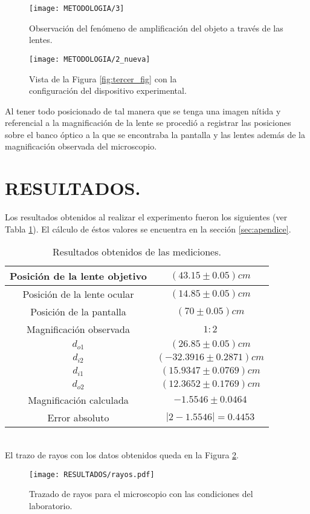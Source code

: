 \documentclass[10pt,a4paper]{article}
\begin{document}
\begin{figure}[ht]
\begin{minipage}{0.5\linewidth}
	\texttt{[image: METODOLOGIA/3]}
	\caption{Observación del fenómeno de amplificación del objeto a través de las lentes.}
	\label{fig:cuarta_fig}
\end{minipage}\hspace{5mm}
\begin{minipage}{0.5\linewidth}
	\texttt{[image: METODOLOGIA/2\_nueva]}
	\caption{Vista de la Figura \ref{fig:tercer_fig} con la\\configuración del dispositivo experimental.}
	\label{fig:quinta_fig}
\end{minipage}
\end{figure}
Al tener todo posicionado de tal manera que se tenga una imagen nítida y referencial a la magnificación de la lente se procedió a registrar las posiciones sobre el banco óptico a la que se encontraba la pantalla y las lentes además de la magnificación observada del microscopio.

\newpage

\section{RESULTADOS.} %
Los resultados obtenidos al realizar el experimento fueron los siguientes (ver Tabla \ref{tab:resultados}). El cálculo de éstos valores se encuentra en la sección \ref{sec:apendice}.
\begin{table}[ht]
\centering
\caption{Resultados obtenidos de las mediciones.}
\begin{tabular}{|c|c|}
	\hline
	Posición de la lente objetivo & $ (43.15\pm0.05)cm $ \\ 	\hline
	Posición de la lente ocular & $ (14.85\pm0.05)cm $  \\ 	\hline
	Posición de la pantalla & $ (70\pm0.05) cm $  \\ 	\hline
	Magnificación observada & $ 1:2 $ \\ 	\hline
	$d_{o1}$ & $ (26.85\pm 0.05) cm $  \\ 	\hline
	$d_{i2}$ & $ (-32.3916\pm 0.2871) cm $ \\ 	\hline
	$d_{i1} $ & $ (15.9347\pm0.0769)cm $  \\ 	\hline
	$d_{o2}$ & $ (12.3652\pm0.1769)cm $  \\ 	\hline
	Magnificación calculada & $ -1.5546\pm0.0464 $  \\ 	\hline
	Error absoluto &  $ |2-1.5546|=0.4453 $\\ 	\hline
\end{tabular}
	\label{tab:resultados}
\end{table}\\
El trazo de rayos con los datos obtenidos queda en la Figura \ref{fig:rayos}.
\begin{figure}[ht]
	\centering
	\texttt{[image: RESULTADOS/rayos.pdf]}
	\caption{Trazado de rayos para el microscopio con las condiciones del laboratorio.}
	\label{fig:rayos}
\end{figure}
\end{document}

